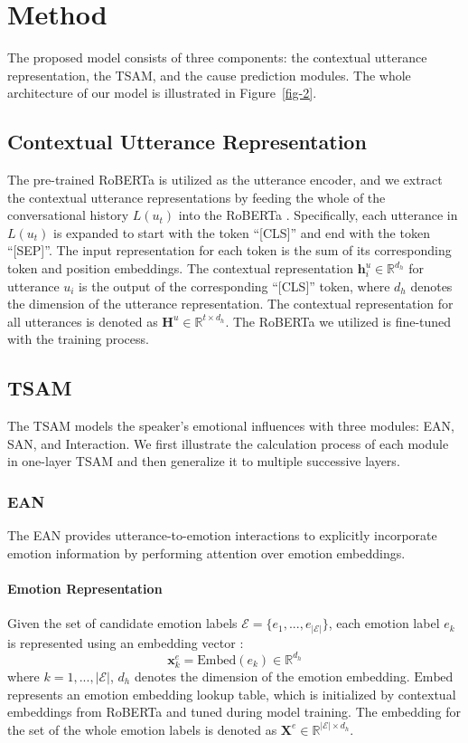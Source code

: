 \documentclass[11pt]{article}
\begin{document}
\section{Method}
The proposed model consists of three components: the contextual utterance representation, the TSAM, and the cause prediction modules. The whole architecture of our model is illustrated in Figure~\ref{fig-2}.

\subsection{Contextual Utterance Representation}
The pre-trained RoBERTa is utilized as the utterance encoder, and we extract the contextual utterance representations by feeding the whole of the conversational history $L(u_t)$ into the RoBERTa \citep{liu2019roberta}.
Specifically, each utterance in $L(u_t)$ is expanded to start with the token ``[CLS]'' and end with the token ``[SEP]''. The input representation for each token is the sum of its corresponding token and position embeddings. The contextual representation $\bm{h}^u_i \in \mathbb{R}^{d_h}$ for utterance $u_i$ is the output of the corresponding ``[CLS]'' token, where $d_h$ denotes the dimension of the utterance representation. The contextual representation for all utterances is denoted as $\bm{H}^{u} \in \mathbb{R}^{t\times d_h}$. The RoBERTa we utilized is fine-tuned with the training process.

\subsection{TSAM}
The TSAM models the speaker's emotional influences with three modules: EAN, SAN, and Interaction. We first illustrate the calculation process of each module in one-layer TSAM and then generalize it to multiple successive layers.


\subsubsection{EAN}
The EAN provides utterance-to-emotion interactions to explicitly incorporate emotion information by performing attention over emotion embeddings.

\paragraph{Emotion Representation} Given the set of candidate emotion labels $\mathcal{E}=\{e_1,...,e_{|\mathcal{E}|}\}$, each emotion label $e_k$ is represented using an embedding vector \citep{cui2019hierarchically}:
\begin{equation}
       \bm{x}^e_k=\text{Embed}(e_k)\in \mathbb{R}^{d_h}
\end{equation}
where $k=1,...,|\mathcal{E}|$, $d_h$ denotes the dimension of the emotion embedding. $\text{Embed}$ represents an emotion embedding lookup table, which is initialized by contextual embeddings from RoBERTa and tuned during model training. The embedding for the set of the whole emotion labels is denoted as $\bm{X}^e \in \mathbb{R}^{|\mathcal{E}|\times d_h}$. 
\end{document}
